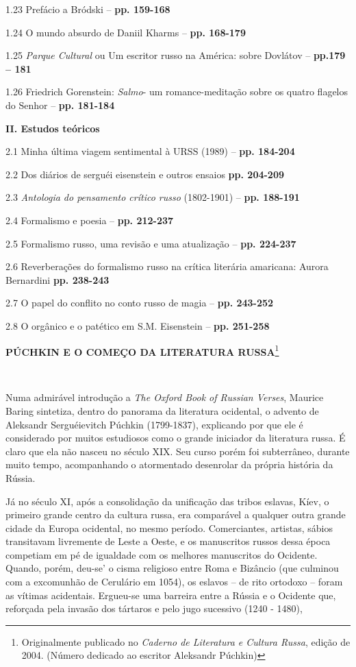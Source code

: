 1.23 Prefácio a Bródski -- \textbf{pp. 159-168}

1.24 O mundo absurdo de Daniil Kharms -- \textbf{pp. 168-179}

1.25 \emph{Parque Cultural} ou Um escritor russo na América: sobre
Dovlátov -- \textbf{pp.179 -- 181}

1.26 Friedrich Gorenstein: \emph{Salmo}- um romance-meditação sobre os
quatro flagelos do Senhor -- \textbf{pp. 181-184}

\textbf{II. Estudos teóricos}

2.1 Minha última viagem sentimental à URSS (1989) -- \textbf{pp.
184-204}

2.2 Dos diários de serguéi eisenstein e outros ensaios \textbf{pp.
204-209}

2.3 \emph{Antologia do pensamento crítico russo} (1802-1901) --
\textbf{pp. 188-191}

2.4 Formalismo e poesia -- \textbf{pp. 212-237}

2.5 Formalismo russo, uma revisão e uma atualização -- \textbf{pp.
224-237}

2.6 Reverberações do formalismo russo na crítica literária amaricana:
Aurora Bernardini \textbf{pp. 238-243}

2.7 O papel do conflito no conto russo de magia -- \textbf{pp. 243-252}

2.8 O orgânico e o patético em S.M. Eisenstein -- \textbf{pp. 251-258}

\textbf{PÚCHKIN E O COMEÇO DA LITERATURA RUSSA}\footnote{Originalmente
  publicado no \emph{Caderno de Literatura e Cultura Russa}, edição de
  2004. (Número dedicado ao escritor Aleksandr Púchkin)}

\textbf{~}


Numa admirável introdução a \emph{The Oxford Book of Russian Verses},
Maurice Baring sintetiza, dentro do panorama da literatura ocidental, o
advento de Aleksandr Serguéievitch Púchkin (1799-1837), explicando por
que ele é considerado por muitos estudiosos como o grande iniciador da
literatura russa. É claro que ela não nasceu no século XIX. Seu curso
porém foi subterrâneo, durante muito tempo, acompanhando o atormentado
desenrolar da própria história da Rússia.

Já no século XI, após a consolidação da unificação das tribos eslavas,
Kíev, o primeiro grande centro da cultura russa, era comparável a
qualquer outra grande cidade da Europa ocidental, no mesmo período.
Comerciantes, artistas, sábios transitavam livremente de Leste a Oeste,
e os manuscritos russos dessa época competiam em pé de igualdade com os
melhores manuscritos do Ocidente. Quando, porém, deu-se' o cisma
religioso entre Roma e Bizâncio (que culmi­nou com a excomunhão de
Cerulário em 1054), os eslavos -- de rito ortodoxo -- foram as vítimas
acidentais. Ergueu-se uma barreira entre a Rússia e o Ociden­te que,
reforçada pela invasão dos tártaros e pelo jugo sucessivo (1240 - 1480),

